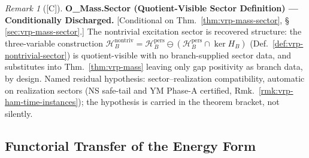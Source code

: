 \documentclass[12pt,oneside]{amsbook}
\theoremstyle{plain}
\theoremstyle{definition}
\theoremstyle{remark}
\newtheorem{remark}[theorem]{Remark}
\newcommand{\status}[1]{\textup{[#1]}}
\begin{document}
\begin{remark}[\status{C}]\label{ob:vrp-mass-sector}
\textbf{O\_Mass.Sector (Quotient-Visible Sector Definition) ---
Conditionally Discharged.}
\textup{[Conditional on Thm.~\ref{thm:vrp-mass-sector},
\S\,\ref{sec:vrp-mass-sector}.]}
The nontrivial excitation sector is recovered structure: the
three-variable construction
$\mathcal{H}_B^{\mathrm{nontriv}} =
\mathcal{H}_B^{\mathrm{pers}} \ominus
(\mathcal{H}_B^{\mathrm{pers}} \cap \ker H_B)$
(Def.~\ref{def:vrp-nontrivial-sector}) is quotient-visible with no
branch-supplied sector data, and substitutes into
Thm.~\ref{thm:vrp-mass} leaving only gap positivity as branch
data, by design.  Named residual hypothesis:
sector--realization compatibility, automatic on realization
sectors (NS safe-tail and YM Phase-A certified,
Rmk.~\ref{rmk:vrp-ham-time-instances}); the hypothesis is carried
in the theorem bracket, not silently.
\end{remark}

\subsection{Functorial Transfer of the Energy Form}
\label{sec:vrp-energy-transfer}
\end{document}
